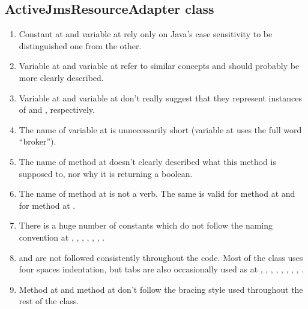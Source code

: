 \subsection{ActiveJmsResourceAdapter class}
\begin{enumerate}
	\item {} Constant  at  and variable  at  rely only on Java's case sensitivity to be distinguished one from the other. 
	\item {} Variable  at  and variable  at  refer to similar concepts and should probably be more clearly described. 
	\item {} Variable  at  and variable  at  don't really suggest that they represent instances of  and , respectively.
	\item {} The name of variable  at  is unnecessarily short (variable  at  uses the full word “broker”). 
	\item {} The name of method  at  doesn't clearly described what this method is supposed to, nor why it is returning a boolean. 
	\item {} The name of method  at  is not a verb. The same is valid for method  at  and for method  at .
	\item {} There is a huge number of constants which do not follow the naming convention at , , , , , , . 
	\item {} and  are not followed consistently throughout the code. Most of the class uses four spaces indentation, but tabs are also occasionally used as at , , , , , , , , . 
	\item {} Method  at  and method  at  don't follow the bracing style used throughout the rest of the class.

\end{enumerate}
